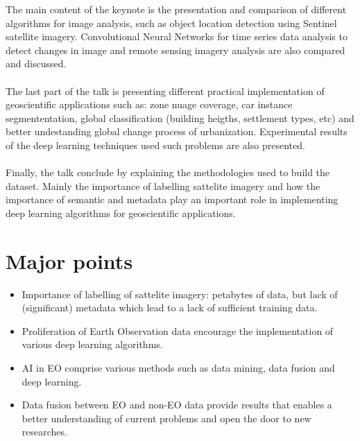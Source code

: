 \documentclass[11pt,a4paper]{article}
\begin{document}
The main content of the keynote is the presentation and comparison of different algorithms for image analysis, such as object location detection using Sentinel  satellite imagery. Convolutional Neural Networks for time series data analysis to detect changes in image and remote sensing imagery analysis are also compared and discussed.

\paragraph{}

The last part of the talk is presenting different practical implementation of geoscientific applications such as: zone nuage coverage, car instance segmententation, global classification (building heigths, settlement types, etc) and better undestanding global change process of urbanization. Experimental results of the deep learning techniques used such problems are also presented.

\paragraph{}

Finally, the talk conclude by explaining the methodologies used to build the dataset. Mainly the importance of labelling sattelite imagery and how the importance of semantic and metadata play an important role in implementing deep learning algorithms for geoscientific applications.

\section{Major points}

\begin{itemize}
  \item Importance of labelling of sattelite imagery: petabytes of data, but lack of (significant) metadata which lead to a lack of sufficient training data.
  \item Proliferation of Earth Observation data encourage the implementation of various deep learning algorithms.
  \item AI in EO comprise various methods such as data mining, data fusion and deep learning.
  \item Data fusion between EO and non-EO data provide results that enables a better understanding of current problems and open the door to new researches.
\end{itemize}
\end{document}

